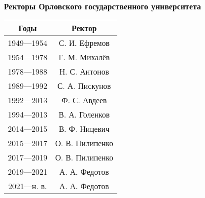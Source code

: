 \documentclass[pdf,hyperref={unicode}, aspectratio=43, serif,11pt]{beamer}
\begin{document}
\begin{frame}
\frametitle{Ректоры Орловского государственного университета}
\begin{center}
\begin{tabular}{|c|c|}
\hline
Годы             &   Ректор              \\
\hline
1949—1954    &   С. И. Ефремов    \\
1954—1978    &   Г. М. Михалёв     \\
1978—1988    &   Н. С. Антонов              \\
1989—1992    &   С. А. Пискунов    \\
1992—2013    &   Ф. С. Авдеев        \\
1994—2013    &   В. А. Голенков    \\
2014—2015    &   В. Ф. Ницевич  \\
2015—2017    &   О. В. Пилипенко \\
2017—2019    &   О. В. Пилипенко           \\
2019—2021    &   А. А. Федотов  \\
2021—н. в.   &   А. А. Федотов              \\
\hline
\end{tabular}
\end{center}
\end{frame}
\end{document}

